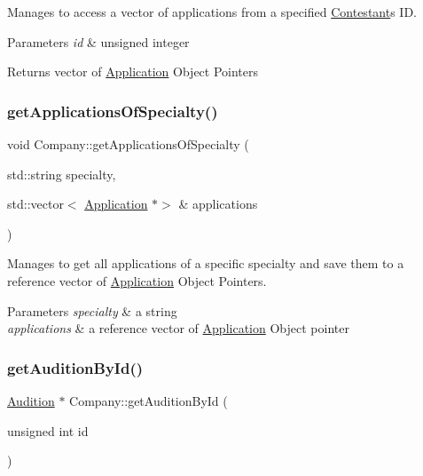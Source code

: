 Manages to access a vector of applications from a specified \hyperlink{class_contestant}{Contestant}\textquotesingle{}s ID. 


\begin{DoxyParams}{Parameters}
{\em id} & unsigned integer \\
\hline
\end{DoxyParams}
\begin{DoxyReturn}{Returns}
vector of \hyperlink{class_application}{Application} Object Pointers 
\end{DoxyReturn}
\mbox{\label{class_company_aaa349bd5785e941e985384f3b9a05288}} 
\subsubsection{\texorpdfstring{get\+Applications\+Of\+Specialty()}{getApplicationsOfSpecialty()}}
{\footnotesize\ttfamily void Company\+::get\+Applications\+Of\+Specialty (\begin{DoxyParamCaption}\item[{std\+::string}]{specialty,  }\item[{std\+::vector$<$ \hyperlink{class_application}{Application} $\ast$$>$ \&}]{applications }\end{DoxyParamCaption})}



Manages to get all applications of a specific specialty and save them to a reference vector of \hyperlink{class_application}{Application} Object Pointers. 


\begin{DoxyParams}{Parameters}
{\em specialty} & a string \\
\hline
{\em applications} & a reference vector of \hyperlink{class_application}{Application} Object pointer \\
\hline
\end{DoxyParams}
\mbox{\label{class_company_ab55bf93a7417322bfd8ef7fc7596e609}} 
\subsubsection{\texorpdfstring{get\+Audition\+By\+Id()}{getAuditionById()}}
{\footnotesize\ttfamily \hyperlink{class_audition}{Audition} $\ast$ Company\+::get\+Audition\+By\+Id (\begin{DoxyParamCaption}\item[{unsigned int}]{id }\end{DoxyParamCaption})}



